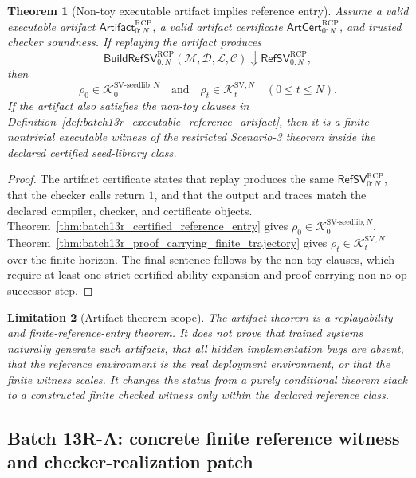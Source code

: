 \documentclass[11pt]{article}
\newtheorem{theorem}{Theorem}[section]
\newtheorem{limitation}[theorem]{Limitation}
\newcommand{\1}{\mathbf{1}}
\newcommand{\RCP}{\mathrm{RCP}}
\providecommand{\Kcal}{\mathcal{K}}
\begin{document}
\begin{theorem}[Non-toy executable artifact implies reference entry]
\label{thm:batch13r_non_toy_executable_artifact_reference_entry}
Assume a valid executable artifact \(\mathsf{Artifact}_{0:N}^{\RCP}\), a valid artifact certificate \(\mathsf{ArtCert}_{0:N}^{\RCP}\), and trusted checker soundness.  If replaying the artifact produces
\[
\mathsf{BuildRefSV}_{0:N}^{\RCP}(\mathcal M,\mathcal D,\mathcal L,\mathcal C)
\Downarrow
\mathsf{RefSV}_{0:N}^{\RCP},
\]
then
\[
\rho_0\in\Kcal_0^{\mathrm{SV\mbox{-}seedlib},N}
\quad\text{and}\quad
\rho_t\in\Kcal_t^{\mathrm{SV},N}\quad(0\le t\le N).
\]
If the artifact also satisfies the non-toy clauses in Definition~\ref{def:batch13r_executable_reference_artifact}, then it is a finite nontrivial executable witness of the restricted Scenario-3 theorem inside the declared certified seed-library class.
\end{theorem}

\begin{proof}
The artifact certificate states that replay produces the same \(\mathsf{RefSV}_{0:N}^{\RCP}\), that the checker calls return \(1\), and that the output and traces match the declared compiler, checker, and certificate objects.  Theorem~\ref{thm:batch13r_certified_reference_entry} gives \(\rho_0\in\Kcal_0^{\mathrm{SV\mbox{-}seedlib},N}\).  Theorem~\ref{thm:batch13r_proof_carrying_finite_trajectory} gives \(\rho_t\in\Kcal_t^{\mathrm{SV},N}\) over the finite horizon.  The final sentence follows by the non-toy clauses, which require at least one strict certified ability expansion and proof-carrying non-no-op successor step.
\end{proof}

\begin{limitation}[Artifact theorem scope]
\label{lim:batch13r_artifact_theorem_scope}
The artifact theorem is a replayability and finite-reference-entry theorem.  It does not prove that trained systems naturally generate such artifacts, that all hidden implementation bugs are absent, that the reference environment is the real deployment environment, or that the finite witness scales.  It changes the status from a purely conditional theorem stack to a constructed finite checked witness only within the declared reference class.
\end{limitation}



\subsection{Batch 13R-A: concrete finite reference witness and checker-realization patch}
\label{subsec:batch13r_concrete_finite_reference_witness}
\end{document}
